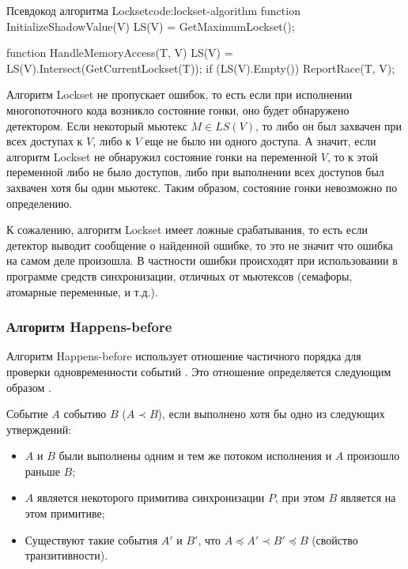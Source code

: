 \begin{listing}{Псевдокод алгоритма Lockset}{code:lockset-algorithm}
function InitializeShadowValue(V) {
  LS(V) = GetMaximumLockset();
}

function HandleMemoryAccess(T, V) {
  LS(V) = LS(V).Intersect(GetCurrentLockset(T));
  if (LS(V).Empty()) {
    ReportRace(T, V);
  }
} 
\end{listing}

Алгоритм Lockset не пропускает ошибок, то есть если при исполнении многопоточного кода возникло состояние гонки, оно будет обнаружено детектором.
Если некоторый мьютекс $M \in LS(V)$, то либо он был захвачен при всех доступах к $V$, либо к $V$ еще не было ни одного доступа.
А значит, если алгоритм Lockset не обнаружил состояние гонки на переменной $V$, то к этой переменной либо не было доступов, либо при выполнении всех доступов был захвачен хотя бы один мьютекс.
Таким образом, состояние гонки невозможно по определению.

К сожалению, алгоритм Lockset имеет ложные срабатывания, то есть если детектор выводит сообщение о найденной ошибке, то это не значит что ошибка на самом деле произошла.
В частности ошибки происходят при использовании в программе средств синхронизации, отличных от мьютексов (семафоры, атомарные переменные, и т.д.).

\subsubsection{Алгоритм Happens-before}

Алгоритм Happens-before использует отношение частичного порядка  для проверки одновременности событий \cite{happens-before}.
Это отношение определяется следующим образом \cite{timur}.

\begin{definition}
Событие $A$  событию $B$ ($A \prec B$), если выполнено хотя бы одно из следующих утверждений:
\begin{itemize}
\item $A$ и $B$ были выполнены одним и тем же потоком исполнения и $A$ произошло раньше $B$;
\item $A$ является  некоторого примитива синхронизации $P$, при этом $B$ является  на этом примитиве;
\item Существуют такие события $A'$ и $B'$, что $A \preceq A' \prec B' \preceq B$ (свойство транзитивности).
\end{itemize}
\end{definition}

